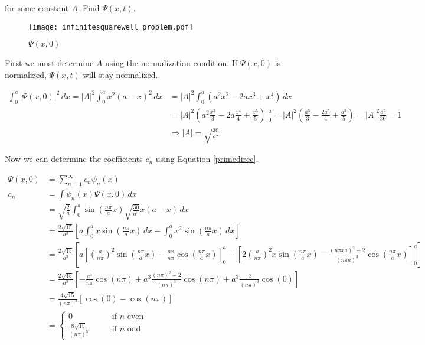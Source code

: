 for some constant $A$. Find $\Psi(x, t)$. 

\begin{figure}[htp]
  \centering
    \texttt{[image: infinitesquarewell\_problem.pdf]}
    \caption{$\Psi(x, 0)$}
    \label{fig:prob}
\end{figure}

First we must determine $A$ using the normalization condition. If $\Psi(x,
0)$ is normalized, $\Psi(x, t)$ will stay normalized. 

\begin{align} \label{}
  \int_{0}^{a} |\Psi(x, 0)|^2 \, dx = |A|^2\int_{0}^{a} x^2(a-x)^2 \, dx
  &= |A|^2 \int_{0}^{a} (a^2x^2 - 2ax^3 + x^4) \, dx \\ &= |A|^2\left( a^2
  \frac{x^3}{3} - 2a \frac{x^4}{4} + \frac{x^5}{5} \right) \Bigg|_0^a = |A|^2
  \left( \frac{a^5}{3} - \frac{2a^5}{4} + \frac{a^5}{5} \right) = |A|^2
  \frac{a^5}{30} = 1 \\ &\Rightarrow |A| = \sqrt{\frac{30}{a^5}} 
\end{align}\vspace{3px}

Now we can determine the coefficients $c_n$ using Equation \ref{primedirec}. 

\begin{align*}
  \Psi(x, 0) &= \sum_{n=1}^{\infty} c_n \psi_n(x) \\
  c_n &= \int \psi_n(x) \Psi(x, 0) \, dx \\
      &= \sqrt{\frac{2}{a}}\int_{0}^{a} \sin\left( \frac{n\pi}{a}x \right)
      \sqrt{\frac{30}{a^5}}x(a-x)\,dx \\
      &= \frac{2\sqrt{15}}{a^3}\left[a\int_{0}^{a} x\sin\left( \frac{n\pi}{a}x
      \right) \, dx - \int_{0}^{a} x^2 \sin \left( \frac{n\pi}{a}x \right) \,
dx\right] \\ &=\frac{2\sqrt{15}}{a^3} \left[ a \left[ \left( \frac{a}{n\pi}
    \right) ^2 \sin \left( \frac{n\pi}{a}x \right) - \frac{ax}{n\pi}\cos \left(
    \frac{n\pi}{a}x\right) \right]_0^a - \left[ 2 \left( \frac{a}{n\pi} \right)
  ^2 x \sin \left( \frac{n\pi}{a}x \right) - \frac{(n\pi x a)^2 - 2}{(n\pi
a)^3}\cos \left( \frac{n\pi}{a}x \right)  \right]_0^a \right]     \\
             &= \frac{2\sqrt{15}}{a^3} \left[ -\frac{a^3}{n\pi}\cos(n\pi)
               + a^3\frac{(n\pi)^2 - 2}{(n\pi)^3}\cos(n\pi) + a^3
             \frac{2}{(n\pi)^3}\cos(0)\right] \\
             &= \frac{4\sqrt{15}}{(n\pi)^3}[\cos(0) - \cos(n\pi)]\\
             &=\begin{cases}
             0 &\qquad \text{if $n$ even} \\
               \frac{8\sqrt{15}}{(n\pi)^3} &\qquad \text{if $n$ odd}
             \end{cases}
\end{align*}

